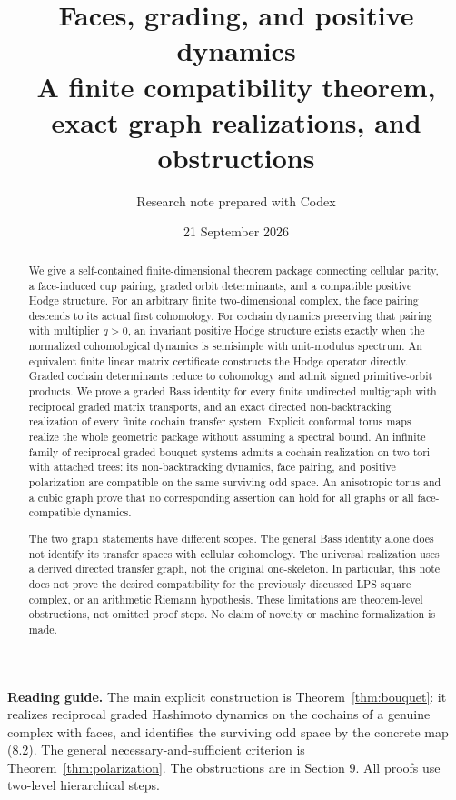 \documentclass[11pt,a4paper]{article}
\title{Faces, grading, and positive dynamics\\\large A finite compatibility theorem, exact graph realizations, and obstructions}
\author{Research note prepared with Codex}
\date{21 September 2026}
\theoremstyle{remark}\newtheorem{remark}[definition]{Remark}
\begin{document}
\maketitle
\begin{abstract}
We give a self-contained finite-dimensional theorem package connecting cellular parity, a face-induced cup pairing, graded orbit determinants, and a compatible positive Hodge structure. For an arbitrary finite two-dimensional complex, the face pairing descends to its actual first cohomology. For cochain dynamics preserving that pairing with multiplier $q>0$, an invariant positive Hodge structure exists exactly when the normalized cohomological dynamics is semisimple with unit-modulus spectrum. An equivalent finite linear matrix certificate constructs the Hodge operator directly. Graded cochain determinants reduce to cohomology and admit signed primitive-orbit products. We prove a graded Bass identity for every finite undirected multigraph with reciprocal graded matrix transports, and an exact directed non-backtracking realization of every finite cochain transfer system. Explicit conformal torus maps realize the whole geometric package without assuming a spectral bound. An infinite family of reciprocal graded bouquet systems admits a cochain realization on two tori with attached trees: its non-backtracking dynamics, face pairing, and positive polarization are compatible on the same surviving odd space. An anisotropic torus and a cubic graph prove that no corresponding assertion can hold for all graphs or all face-compatible dynamics.

The two graph statements have different scopes. The general Bass identity alone does not identify its transfer spaces with cellular cohomology. The universal realization uses a derived directed transfer graph, not the original one-skeleton. In particular, this note does not prove the desired compatibility for the previously discussed LPS square complex, or an arithmetic Riemann hypothesis. These limitations are theorem-level obstructions, not omitted proof steps. No claim of novelty or machine formalization is made.
\end{abstract}
\medskip
\textbf{Reading guide.} The main explicit construction is Theorem~\ref{thm:bouquet}: it realizes reciprocal graded Hashimoto dynamics on the cochains of a genuine complex with faces, and identifies the surviving odd space by the concrete map (8.2). The general necessary-and-sufficient criterion is Theorem~\ref{thm:polarization}. The obstructions are in Section 9. All proofs use two-level hierarchical steps.
\clearpage
\tableofcontents
\newpage
\end{document}
